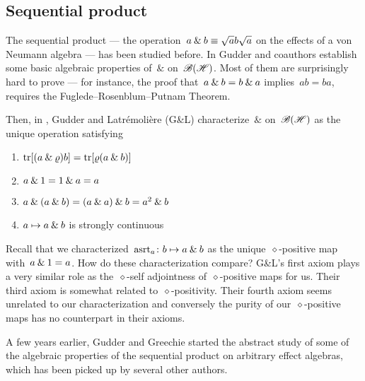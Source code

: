 \documentclass[b]{subfiles}
\begin{document}
\subsection{Sequential product}
\begin{parsec}%
\begin{point}%
The sequential product --- the
    operation~$a \mathbin{\&} b \equiv \sqrt{a}b\sqrt{a}$
    on the effects of a von Neumann algebra
    --- has been studied before.
In \cite{gudder2001sequential,gheondea2004sequential}
    Gudder and coauthors establish some basic algebraic properties of~$\&$
    on~$\mathscr{B}(\mathscr{H})$.
Most of them are surprisingly hard to prove ---
    for instance, the proof that~$a \mathbin{\&} b=b \mathbin{\&} a$
    implies~$ab = ba$, requires
    the Fuglede--Rosenblum--Putnam Theorem.
\begin{point}%
Then, in \cite{gudder2008characterization},
    Gudder and Latr\'emoli\`ere (G\&L)
    characterize~$\&$ on~$\mathscr{B}(\mathscr{H})$ as the unique operation satisfying
\begin{multicols}{2}
\begin{enumerate}
    \item $\mathop{\mathrm{tr}} [ (a \mathbin{\&} \varrho) b] = \mathop{\mathrm{tr}} [\varrho
                    (a \mathbin{\&} b)]$
    \item $a \mathbin{\&} 1 = 1 \mathbin{\&} a = a$
    \item $ a \mathbin{\&} (a \mathbin{\&} b) =
            (a \mathbin{\&} a) \mathbin{\&} b =
            a^2 \mathbin{\&} b$
        \item $a \mapsto a \mathbin{\&} b$ is strongly continuous
\end{enumerate}    
\end{multicols}
\noindent
Recall that we characterized~$\mathrm{asrt}_a \colon b \mapsto a \mathbin{\&} b$
    as the unique~$\diamond$-positive map with~$a \mathbin{\&} 1 = a$.
How do these characterization compare?
G\&L's first axiom plays a very similar role
        as the~$\diamond$-self adjointness of~$\diamond$-positive maps for us.
Their third axiom is somewhat related to~$\diamond$-positivity.
Their fourth axiom seems unrelated to our characterization
    and conversely the purity of our~$\diamond$-positive maps
    has no counterpart in their axioms.
\end{point}
\begin{point}%
A few years earlier, Gudder and Greechie started
    \cite{gudder2001sequential}
    the abstract study of some of the algebraic properties of the
    sequential product on arbitrary effect algebras,
    which has been picked up by several other authors.

\end{point}
\end{point}
\end{parsec}
\end{document}
